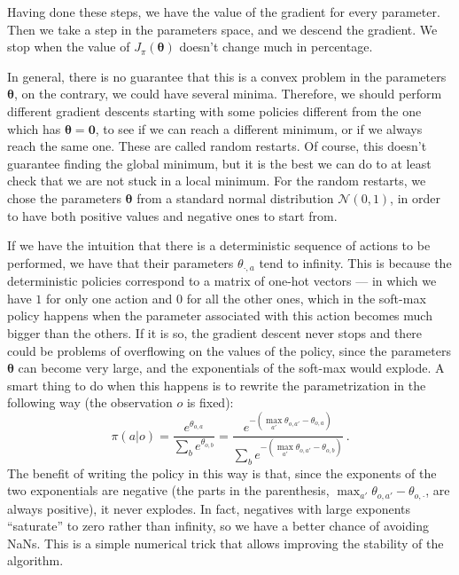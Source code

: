 Having done these steps, we have the value of the gradient for every parameter. Then we take a step in the parameters space, and we descend the gradient. We stop when the value of $J_\pi (\boldsymbol \theta)$ doesn't change much in percentage.

In general, there is no guarantee that this is a convex problem in the parameters $\boldsymbol \theta$, on the contrary, we could have several minima. Therefore, we should perform different gradient descents starting with some policies different from the one which has $\boldsymbol \theta = \mathbf 0$, to see if we can reach a different minimum, or if we always reach the same one. These are called random restarts. Of course, this doesn't guarantee finding the global minimum, but it is the best we can do to at least check that we are not stuck in a local minimum. For the random restarts, we chose the parameters $\boldsymbol \theta$ from a standard normal distribution $\mathcal N(0,1)$, in order to have both positive values and negative ones to start from.

If we have the intuition that there is a deterministic sequence of actions to be performed, we have that their parameters $\theta_{\cdot,a}$ tend to infinity. This is because the deterministic policies correspond to a matrix of one-hot vectors --- in which we have $1$ for only one action and $0$ for all the other ones, which in the soft-max policy happens when the parameter associated with this action becomes much bigger than the others. If it is so, the gradient descent never stops and there could be problems of overflowing on the values of the policy, since the parameters $\boldsymbol \theta$ can become very large, and the exponentials of the soft-max would explode. A smart thing to do when this happens is to rewrite the parametrization in the following way (the observation $o$ is fixed):
\begin{equation}
    \pi(a | o) = \frac{e^{\theta_{o,a}}}{\sum_b e^{\theta_{o,b}}} = \frac{e^{-(\max_{a'} \theta_{o,a'} - \theta_{o,a})}}{\sum_b e^{-(\max_{a'} \theta_{o,a'} - \theta_{o,b})}} \, .
    \label{eq:pi-clipped}
\end{equation}
The benefit of writing the policy in this way is that, since the exponents of the two exponentials are negative (the parts in the parenthesis, $\max_{a'} \theta_{o,a'} - \theta_{o,\cdot}$, are always positive), it never explodes. In fact, negatives with large exponents ``saturate'' to zero rather than infinity, so we have a better chance of avoiding NaNs. This is a simple numerical trick that allows improving the stability of the algorithm. %


